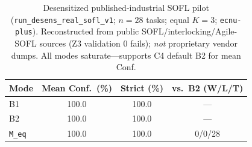 \begin{table}[t]
  \centering
  \caption{Desensitized published-industrial SOFL pilot
    (\texttt{run\_desens\_real\_sofl\_v1}; $n{=}28$ tasks; equal $K{=}3$;
    \texttt{ecnu-plus}).
    Reconstructed from public SOFL/interlocking/Agile-SOFL sources
    (Z3 validation 0 fails); \emph{not} proprietary vendor dumps.
    All modes saturate---supports C4 default B2 for mean Conf.}
  \label{tab:desens-real-sofl}
  \footnotesize
  \begin{tabular}{lccc}
    \toprule
    Mode & Mean Conf.\ (\%) & Strict (\%) & vs.\ B2 (W/L/T) \\
    \midrule
    B1 & 100.0 & 100.0 & --- \\
    B2 & 100.0 & 100.0 & --- \\
    \texttt{M\_eq} & 100.0 & 100.0 & 0/0/28 \\
    \bottomrule
  \end{tabular}
\end{table}
